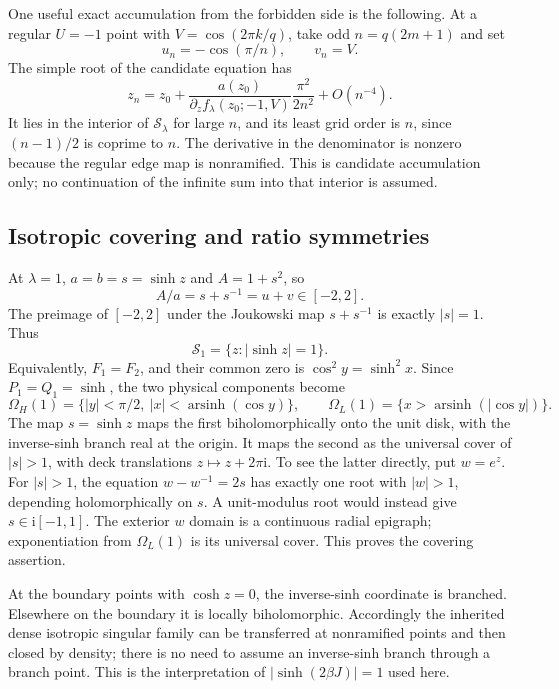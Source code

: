 \documentclass[11pt]{article}
\numberwithin{equation}{section}
\theoremstyle{definition}
\newcommand{\ii}{\mathrm i}
\newcommand{\cS}{\mathcal S}
\newcommand{\OH}{\Omega_H}
\newcommand{\OL}{\Omega_L}
\begin{document}
One useful exact accumulation from the forbidden side is the following.
At a regular \(U=-1\) point with
\(V=\cos(2\pi k/q)\), take odd \(n=q(2m+1)\) and set
\[
 u_n=-\cos(\pi/n),\qquad v_n=V.
\]
The simple root of the candidate equation has
\[
 z_n=z_0+\frac{a(z_0)}{\partial_z f_\lambda(z_0;-1,V)}
                  \frac{\pi^2}{2n^2}+O(n^{-4}).
\]
It lies in the interior of \(\cS_\lambda\) for large \(n\), and its
least grid order is \(n\), since \((n-1)/2\) is coprime to \(n\).
The derivative in the denominator is nonzero because the regular
edge map is nonramified. This is candidate accumulation only; no
continuation of the infinite sum into that interior is assumed.

\subsection{Isotropic covering and ratio symmetries}

At \(\lambda=1\), \(a=b=s=\sinh z\) and \(A=1+s^2\), so
\[
 A/a=s+s^{-1}=u+v\in[-2,2].
\]
The preimage of \([-2,2]\) under the Joukowski map \(s+s^{-1}\)
is exactly \(|s|=1\). Thus
\begin{equation}\label{eq:isotropicgeometry}
 \cS_1=\{z:|\sinh z|=1\}.
\end{equation}
Equivalently, \(F_1=F_2\), and their common zero is
\(\cos^2 y=\sinh^2x\). Since \(P_1=Q_1=\sinh\), the two physical
components become
\[
 \OH(1)=\{|y|<\pi/2,\ |x|<\operatorname{arsinh}(\cos y)\},
 \qquad
 \OL(1)=\{x>\operatorname{arsinh}(|\cos y|)\}.
\]
The map \(s=\sinh z\) maps the first biholomorphically onto the unit
disk, with the inverse-sinh branch real at the origin. It maps the
second as the universal cover of \(|s|>1\), with deck translations
\(z\mapsto z+2\pi\ii\). To see the latter directly, put \(w=e^z\).
For \(|s|>1\), the equation \(w-w^{-1}=2s\) has exactly one root
with \(|w|>1\), depending holomorphically on \(s\). A unit-modulus
root would instead give \(s\in\ii[-1,1]\). The exterior \(w\) domain
is a continuous radial epigraph; exponentiation from \(\OL(1)\)
is its universal cover. This proves the covering assertion.

At the boundary points with \(\cosh z=0\), the inverse-sinh coordinate
is branched. Elsewhere on the boundary it is locally biholomorphic.
Accordingly the inherited dense isotropic singular family can be
transferred at nonramified points and then closed by density; there
is no need to assume an inverse-sinh branch through a branch point.
This is the interpretation of \(|\sinh(2\beta J)|=1\) used here.
\end{document}
